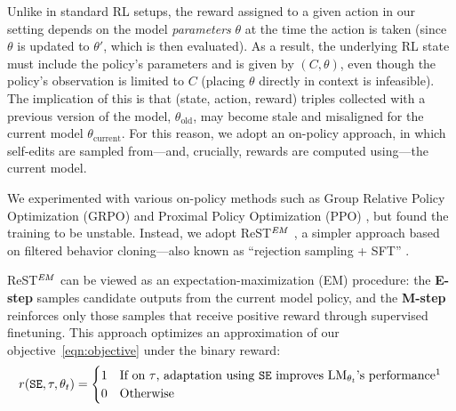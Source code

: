 \documentclass{article}
\begin{document}
Unlike in standard RL setups, the reward assigned to a given action in our setting depends on the model \textit{parameters} $\theta$ at the time the action is taken (since $\theta$ is updated to $\theta'$, which is then evaluated). As a result, the underlying RL state must include the policy's parameters and is given by $(C, \theta)$, even though the policy's observation is limited to $C$ (placing $\theta$ directly in context is infeasible). The implication of this is that (state, action, reward) triples collected with a previous version of the model, $\theta_{\text{old}}$, may become stale and misaligned for the current model $\theta_{\text{current}}$. For this reason, we adopt an on-policy approach, in which self-edits are sampled from---and, crucially, rewards are computed using---the current model.

We experimented with various on-policy methods such as Group Relative Policy Optimization (GRPO) \citep{shao2024deepseekmath} and Proximal Policy Optimization (PPO) \citep{schulman2017proximal}, but found the training to be unstable. Instead, we adopt ReST$^\text{\textit{EM}}$ \citep{singh2023beyond}, a simpler approach based on filtered behavior cloning---also known as ``rejection sampling + SFT'' \citep{gilks1992rejectionsampling, kumar2022preferofflinereinforcementlearning, bai2022traininghelpfulharmlessassistant, zelikman2022starbootstrappingreasoningreasoning, yuan2023scalingrelationshiplearningmathematical}.

ReST$^\text{\textit{EM}}$ can be viewed as an expectation-maximization (EM) procedure: the \textbf{E-step} samples candidate outputs from the current model policy, and the \textbf{M-step} reinforces only those samples that receive positive reward through supervised finetuning. This approach optimizes an approximation of our objective~\eqref{eqn:objective} under the binary reward:
\begin{equation}
\label{eqn:reward}
r(\texttt{SE}, \tau, \theta_t) =
\begin{cases}
1 & \text{If on } \tau \text{, adaptation using } \texttt{SE} \text{ improves } \text{LM}_{\theta_t}\text{'s performance} \footnotemark \\
0 & \text{Otherwise}
\end{cases}
\end{equation}
\end{document}
